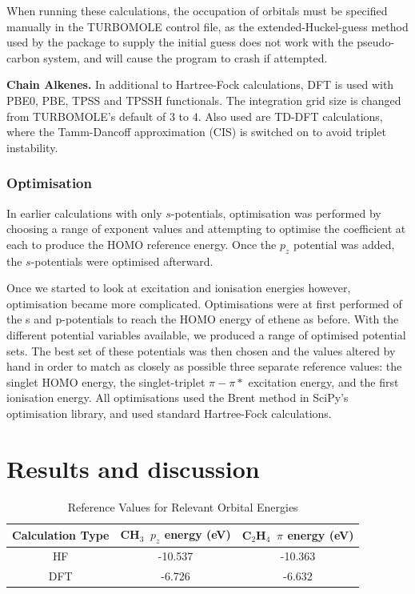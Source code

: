 \documentclass[journal=jctcce,manuscript=article]{achemso}
\begin{document}
When running these calculations, the occupation of orbitals must be specified manually in the TURBOMOLE control file, as the extended-Huckel-guess method used by the package to supply the initial guess does not work with the pseudo-carbon system, and will cause the program to crash if attempted.

\textbf{Chain Alkenes.} In additional to Hartree-Fock calculations, DFT is used with PBE0, PBE, TPSS and TPSSH functionals. The integration grid size is changed from TURBOMOLE's default of 3 to 4. Also used are TD-DFT calculations, where the Tamm-Dancoff approximation (CIS) is switched on to avoid triplet instability.

\subsubsection{Optimisation}

In earlier calculations with only \(s\)-potentials, optimisation was performed by choosing a range of exponent values and attempting to optimise the coefficient at each to produce the HOMO reference energy. Once the \(p_{z}\) potential was added, the \(s\)-potentials were optimised afterward. 

Once we started to look at excitation and ionisation energies however, optimisation became more complicated. Optimisations were at first performed of the s and p-potentials to reach the HOMO energy of ethene as before. With the different potential variables available, we produced a range of optimised potential sets. The best set of these potentials was then chosen and the values altered by hand in order to match as closely as possible three separate reference values: the singlet HOMO energy, the singlet-triplet \(\pi-\pi*\) excitation energy, and the first ionisation energy. All optimisations used the Brent method in SciPy's optimisation library, and used standard Hartree-Fock calculations.

\section{Results and discussion}

\begin{table}[ht]
\caption{Reference Values for Relevant Orbital Energies} 
\centering
\begin{tabular}{c c c}
\hline\hline
Calculation Type & CH\(_{3}\)\, \(p_{z}\) energy (eV) & C\(_{2}\)H\(_{4}\)\, \(\pi\) energy (eV) \\
\hline
HF & -10.537 & -10.363 \\
DFT & -6.726 & -6.632 \\
\hline
\end{tabular}
\label{table:ref_values_1}
\end{table}
\end{document}
